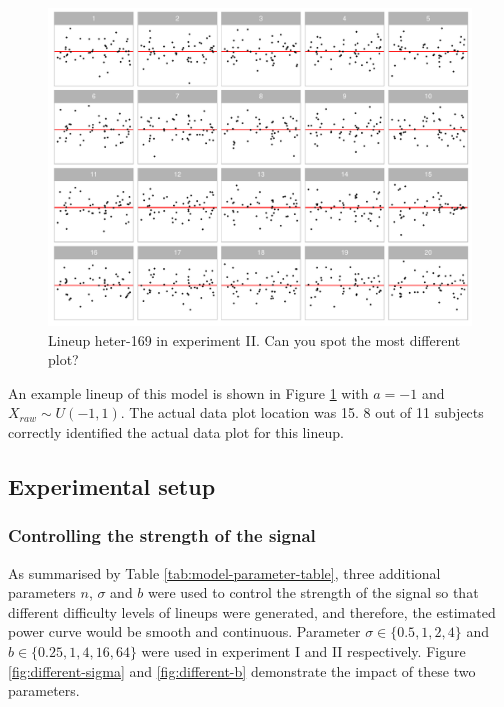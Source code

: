 \documentclass[]{interact}
\theoremstyle{plain}%
\theoremstyle{definition}
\theoremstyle{remark}
\begin{document}
\begin{figure}

{\centering \includegraphics[width=1\linewidth]{paper_comparison_files/figure-latex/example-heter-lineup-1} 

}

\caption{Lineup heter-169 in experiment II. Can you spot the most different plot? \label{fig:example-heter-lineup}}\label{fig:example-heter-lineup}
\end{figure}

An example lineup of this model is shown in Figure
\ref{fig:example-heter-lineup} with \(a = -1\) and
\(X_{raw} \sim U(-1, 1)\). The actual data plot location was 15. 8 out
of 11 subjects correctly identified the actual data plot for this
lineup.

\hypertarget{experimental-setup}{%
\subsection{Experimental setup}\label{experimental-setup}}

\hypertarget{controlling-the-strength-of-the-signal}{%
\subsubsection{Controlling the strength of the
signal}\label{controlling-the-strength-of-the-signal}}

As summarised by Table \ref{tab:model-parameter-table}, three additional
parameters \(n\), \(\sigma\) and \(b\) were used to control the strength
of the signal so that different difficulty levels of lineups were
generated, and therefore, the estimated power curve would be smooth and
continuous. Parameter \(\sigma \in \{0.5, 1, 2, 4\}\) and
\(b \in \{0.25, 1, 4, 16, 64\}\) were used in experiment I and II
respectively. Figure \ref{fig:different-sigma} and \ref{fig:different-b}
demonstrate the impact of these two parameters.
\end{document}

